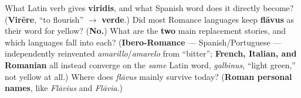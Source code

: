 \begin{tcolorbox}[breakable,colback=teal!4,colframe=teal!35!black,title={Before you move on}]
What Latin verb gives \textbf{viridis}, and what Spanish word does it directly become? (\textbf{Virēre}, \textquotedblleft{}to flourish\textquotedblright{} $\to$ \textbf{verde}.) Did most Romance languages keep \textbf{flāvus} as their word for yellow? (\textbf{No.}) What are the \textbf{two} main replacement stories, and which languages fall into each? (\textbf{Ibero-Romance} — Spanish/Portuguese — independently reinvented \emph{amarillo}/\emph{amarelo} from \textquotedblleft{}bitter\textquotedblright{}; \textbf{French, Italian, and Romanian} all instead converge on the \emph{same} Latin word, \emph{galbinus}, \textquotedblleft{}light green,\textquotedblright{} not yellow at all.) Where does \emph{flāvus} mainly survive today? (\textbf{Roman personal names}, like \emph{Flāvius} and \emph{Flāvia}.)
\end{tcolorbox}

